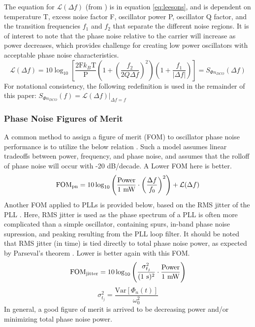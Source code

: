 		The equation for $\mathcal{L}(\Delta f)$ (from \cite{lee_hajimiri_2000}) is in equation \ref{eq:leesons}, and is dependent on temperature T, excess noise factor F, oscillator power P, oscillator Q factor, and the transition frequencies $f_1$ and $f_2$ that separate the different noise regions. It is of interest to note that the phase noise relative to the carrier will increase as power decreases, which provides challenge for creating low power oscillators with acceptable phase noise characteristics. 
		\begin{equation}\label{eq:leesons}
		\mathcal{L}(\Delta f) = 10\log_{10}\left[\frac{2\text{F}k_B\text{T}}{\text{P}}\left(1+\left(\frac{f_2}{2Q\Delta f}\right)^2\right)\left(1+\frac{f_1}{|\Delta f|}\right)\right] = S_{\Phi n_{DCO}}(\Delta f)
		\end{equation}
		For notational consistency, the following redefinition is used in the remainder of this paper: $S_{\Phi n_{DCO}}(f) = \mathcal{L}(\Delta f)|_{\Delta f = f}$

	\subsubsection{Phase Noise Figures of Merit}
	A common method to assign a figure of merit (FOM) to oscillator phase noise performance is to utilize the below relation \cite{Kinget1999}. Such a model assumes linear tradeoffs between power, frequency, and phase noise, and assumes that the rolloff of phase noise will occur with -20 dB/decade. A Lower FOM here is better.
	\begin{equation}\label{eq:fom_pn}
		\textnormal{FOM}_{\textnormal{pn}} = 10\log_{10}\left(\frac{\textnormal{Power}}{\textnormal{1 mW}}\cdot\left(\frac{\Delta f}{f_0}\right)^2\right) + \mathcal{L}(\Delta f)
	\end{equation}
	Another FOM applied to PLLs is provided below, based on the RMS jitter of the PLL \cite{XiangGao2009}. Here, RMS jitter is used as the phase spectrum of a PLL is often more complicated than a simple oscillator, containing spurs, in-band phase noise supression, and peaking resulting from the PLL loop filter. It should be noted that RMS jitter (in time) is tied directly to total phase noise power, as expected by Parseval's theorem \cite{parseval_1799}.  Lower is better again with this FOM. 
	\begin{equation}\label{eq:fom_jitter}
		\textnormal{FOM}_{\textnormal{jitter}} = 10\log_{10}\left(\frac{\sigma_{t_j}^2}{(\textnormal{1 s})^2}\cdot\frac{\textnormal{Power}}{\textnormal{1 mW}}\right)
	\end{equation}
	\begin{equation}
		\sigma_{t_j}^2 = \frac{\mathrm{Var}[\Phi_{n}(t)]}{\omega_0^2}
	\end{equation}
	In general, a good figure of merit is arrived to be decreasing power and/or minimizing total phase noise power. 
	
